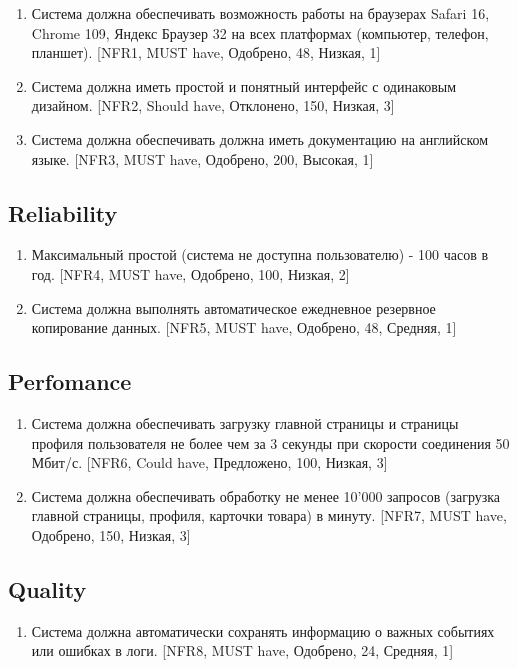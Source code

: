 \documentclass{article}
\begin{document}
\begin{enumerate}
    \item Система должна обеспечивать возможность работы на браузерах Safari 16, Chrome 109, Яндекс Браузер 32 на всех платформах (компьютер, телефон, планшет). [NFR1, MUST have, Одобрено, 48, Низкая, 1]
    \item Система должна иметь простой и понятный интерфейс с одинаковым дизайном. [NFR2, Should have, Отклонено, 150, Низкая, 3]
    \item Система должна обеспечивать должна иметь документацию на английском языке. [NFR3, MUST have, Одобрено, 200, Высокая, 1]
\end{enumerate}

\subsection{Reliability}

\begin{enumerate}
    \item Максимальный простой (система не доступна пользователю) - 100 часов в год. [NFR4, MUST have, Одобрено, 100, Низкая, 2]
    \item Система должна выполнять автоматическое ежедневное резервное копирование данных. [NFR5, MUST have, Одобрено, 48, Средняя, 1]
\end{enumerate}

\subsection{Perfomance}

\begin{enumerate}
    \item Система должна обеспечивать загрузку главной страницы и страницы профиля пользователя не более чем за 3 секунды при скорости соединения 50 Мбит/с. [NFR6, Could have, Предложено, 100, Низкая, 3] 
    \item Система должна обеспечивать обработку не менее 10'000 запросов (загрузка главной страницы, профиля, карточки товара) в минуту. [NFR7, MUST have, Одобрено, 150, Низкая, 3]

\end{enumerate}

\subsection{Quality}

\begin{enumerate}
    \item Система должна автоматически сохранять информацию о важных событиях или ошибках в логи. [NFR8, MUST have, Одобрено, 24, Средняя, 1]
\end{enumerate}
\end{document}
